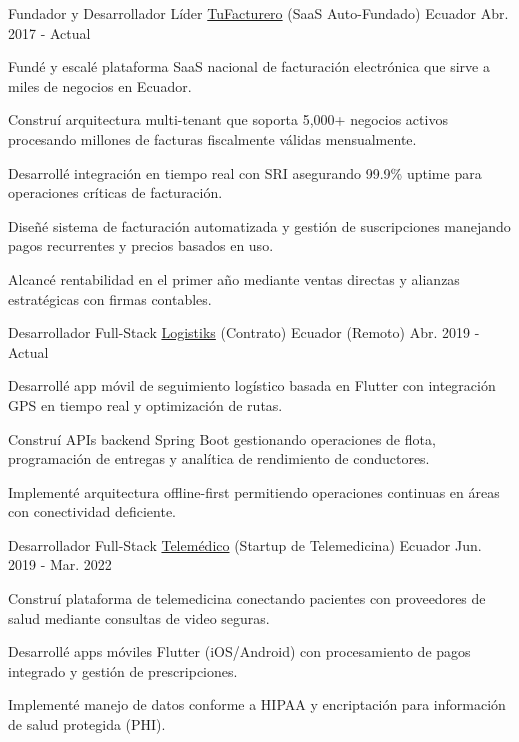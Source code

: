 \begin{cventries}
  \cventry
    {Fundador y Desarrollador Líder} %
    {\href{https://tufacturero.ec}{TuFacturero} (SaaS Auto-Fundado)} %
    {Ecuador} %
    {Abr. 2017 - Actual} %
    {
      \begin{cvitems} %
        \item {Fundé y escalé plataforma SaaS nacional de facturación electrónica que sirve a miles de negocios en Ecuador.}
        \item {Construí arquitectura multi-tenant que soporta 5,000+ negocios activos procesando millones de facturas fiscalmente válidas mensualmente.}
        \item {Desarrollé integración en tiempo real con SRI asegurando 99.9\% uptime para operaciones críticas de facturación.}
        \item {Diseñé sistema de facturación automatizada y gestión de suscripciones manejando pagos recurrentes y precios basados en uso.}
        \item {Alcancé rentabilidad en el primer año mediante ventas directas y alianzas estratégicas con firmas contables.}
      \end{cvitems}
    }

  \cventry
    {Desarrollador Full-Stack} %
    {\href{https://logistiksusa.com/}{Logistiks} (Contrato)} %
    {Ecuador (Remoto)} %
    {Abr. 2019 - Actual} %
    {
      \begin{cvitems} %
        \item {Desarrollé app móvil de seguimiento logístico basada en Flutter con integración GPS en tiempo real y optimización de rutas.}
        \item {Construí APIs backend Spring Boot gestionando operaciones de flota, programación de entregas y analítica de rendimiento de conductores.}
        \item {Implementé arquitectura offline-first permitiendo operaciones continuas en áreas con conectividad deficiente.}
      \end{cvitems}
    }

  \cventry
    {Desarrollador Full-Stack} %
    {\href{https://telemedico.com.ec/}{Telemédico} (Startup de Telemedicina)} %
    {Ecuador} %
    {Jun. 2019 - Mar. 2022} %
    {
      \begin{cvitems} %
        \item {Construí plataforma de telemedicina conectando pacientes con proveedores de salud mediante consultas de video seguras.}
        \item {Desarrollé apps móviles Flutter (iOS/Android) con procesamiento de pagos integrado y gestión de prescripciones.}
        \item {Implementé manejo de datos conforme a HIPAA y encriptación para información de salud protegida (PHI).}
      \end{cvitems}
    }


\end{cventries}
